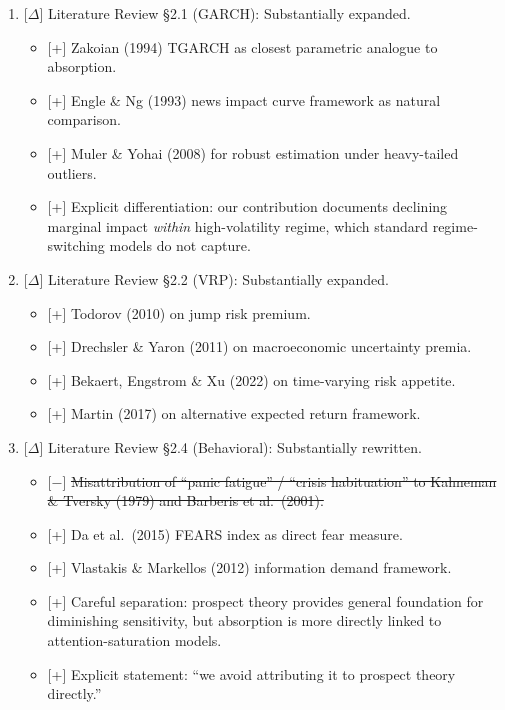 \documentclass[12pt,a4paper]{article}
\newcommand{\added}[1]{\textcolor{addgreen}{[+] #1}}
\newcommand{\deleted}[1]{\textcolor{delred}{[$-$] \st{#1}}}
\newcommand{\modified}[1]{\textcolor{modblue}{[$\Delta$] #1}}
\begin{document}
\begin{enumerate}[leftmargin=*]

\item \modified{Literature Review \S2.1 (GARCH): Substantially expanded.}
\begin{itemize}
\item \added{Zakoian (1994) TGARCH as closest parametric analogue to absorption.}
\item \added{Engle \& Ng (1993) news impact curve framework as natural comparison.}
\item \added{Muler \& Yohai (2008) for robust estimation under heavy-tailed outliers.}
\item \added{Explicit differentiation: our contribution documents declining marginal impact \textit{within} high-volatility regime, which standard regime-switching models do not capture.}
\end{itemize}

\item \modified{Literature Review \S2.2 (VRP): Substantially expanded.}
\begin{itemize}
\item \added{Todorov (2010) on jump risk premium.}
\item \added{Drechsler \& Yaron (2011) on macroeconomic uncertainty premia.}
\item \added{Bekaert, Engstrom \& Xu (2022) on time-varying risk appetite.}
\item \added{Martin (2017) on alternative expected return framework.}
\end{itemize}

\item \modified{Literature Review \S2.4 (Behavioral): Substantially rewritten.}
\begin{itemize}
\item \deleted{Misattribution of ``panic fatigue'' / ``crisis habituation'' to Kahneman \& Tversky (1979) and Barberis et al.\ (2001).}
\item \added{Da et al.\ (2015) FEARS index as direct fear measure.}
\item \added{Vlastakis \& Markellos (2012) information demand framework.}
\item \added{Careful separation: prospect theory provides general foundation for diminishing sensitivity, but absorption is more directly linked to attention-saturation models.}
\item \added{Explicit statement: ``we avoid attributing it to prospect theory directly.''}
\end{itemize}


\end{enumerate}
\end{document}

